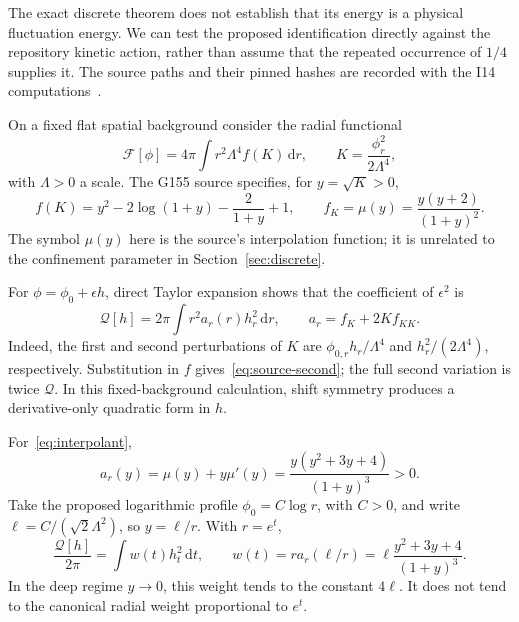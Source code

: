 \documentclass[11pt,letterpaper]{article}
\newcommand{\dd}{\,\mathrm d}
\theoremstyle{definition}
\numberwithin{equation}{section}
\begin{document}
The exact discrete theorem does not establish that its energy is a
physical fluctuation energy. We can test the proposed identification
directly against the repository kinetic action, rather than assume that
the repeated occurrence of $1/4$ supplies it. The source paths and their
pinned hashes are recorded with the I14 computations~\cite{archive}.

On a fixed flat spatial background consider the radial functional
\begin{equation}
 \mathcal F[\phi]=4\pi\int r^2\Lambda^4f(K)\dd r,
 \qquad K=\frac{\phi_r^2}{2\Lambda^4},
 \label{eq:scalar-action}
\end{equation}
with $\Lambda>0$ a scale. The G155 source specifies, for $y=\sqrt K>0$,
\begin{equation}
 f(K)=y^2-2\log(1+y)-\frac2{1+y}+1,
 \qquad f_K=\mu(y)=\frac{y(y+2)}{(1+y)^2}.
 \label{eq:interpolant}
\end{equation}
The symbol $\mu(y)$ here is the source's interpolation function; it is
unrelated to the confinement parameter in Section~\ref{sec:discrete}.

For $\phi=\phi_0+\epsilon h$, direct Taylor expansion shows that the
coefficient of $\epsilon^2$ is
\begin{equation}
 \mathcal Q[h]=2\pi\int r^2a_r(r)h_r^2\dd r,
 \qquad a_r=f_K+2Kf_{KK}.
 \label{eq:source-second}
\end{equation}
Indeed, the first and second perturbations of $K$ are
$\phi_{0,r}h_r/\Lambda^4$ and $h_r^2/(2\Lambda^4)$, respectively.
Substitution in $f$ gives~\eqref{eq:source-second}; the full second
variation is twice $\mathcal Q$. In this fixed-background calculation,
shift symmetry produces a derivative-only quadratic form in $h$.

For~\eqref{eq:interpolant},
\begin{equation}
 a_r(y)=\mu(y)+y\mu'(y)
       =\frac{y(y^2+3y+4)}{(1+y)^3}>0.
 \label{eq:radial-coeff}
\end{equation}
Take the proposed logarithmic profile $\phi_0=C\log r$, with $C>0$, and
write $\ell=C/(\sqrt2\Lambda^2)$, so $y=\ell/r$. With $r=e^t$,
\begin{equation}
 \frac{\mathcal Q[h]}{2\pi}=\int w(t)h_t^2\dd t,
 \qquad w(t)=r a_r(\ell/r)
       =\ell\frac{y^2+3y+4}{(1+y)^3}.
 \label{eq:log-weight}
\end{equation}
In the deep regime $y\to0$, this weight tends to the constant $4\ell$.
It does not tend to the canonical radial weight proportional to $e^t$.
\end{document}
